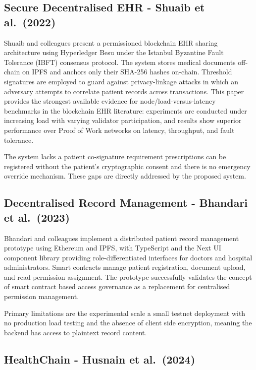 \documentclass[12pt,a4wide]{report}
\begin{document}
\subsection{Secure Decentralised EHR - Shuaib et al.\ (2022)}

Shuaib and colleagues present a permissioned blockchain EHR sharing architecture
using Hyperledger Besu under the Istanbul Byzantine Fault Tolerance (IBFT) consensus
protocol. The system stores medical documents off-chain on IPFS and anchors only
their SHA-256 hashes on-chain. Threshold signatures are employed to guard against
privacy-linkage attacks in which an adversary attempts to correlate patient records
across transactions. This paper provides the strongest available evidence for
node/load-versus-latency benchmarks in the blockchain EHR literature: experiments
are conducted under increasing load with varying validator participation, and
results show superior performance over Proof of Work networks on latency, throughput,
and fault tolerance.

The system lacks a patient co-signature requirement prescriptions can be
registered without the patient's cryptographic consent and there is no emergency
override mechanism. These gaps are directly addressed by the proposed system.

\subsection{Decentralised Record Management - Bhandari et al.\ (2023)}

Bhandari and colleagues implement a distributed patient record management prototype
using Ethereum and IPFS, with TypeScript and the Next UI component library providing
role-differentiated interfaces for doctors and hospital administrators. Smart
contracts manage patient registration, document upload, and read-permission
assignment. The prototype successfully validates the concept of smart contract based
access governance as a replacement for centralised permission management.

Primary limitations are the experimental scale a small testnet deployment with
no production load testing and the absence of client side encryption, meaning
the backend has access to plaintext record content.

\subsection{HealthChain - Husnain et al.\ (2024)}
\end{document}

